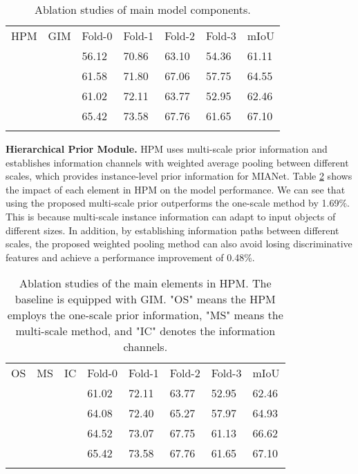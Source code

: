 \documentclass[10pt,twocolumn,letterpaper]{article}
\begin{document}
\begin{table}[]
	\centering
	\renewcommand\tabcolsep{2.2pt}
	\caption{Ablation studies of main model components.}
	\begin{tabular}{ll|llll|l}
		\Xhline{1.5pt}
		HPM & GIM & Fold-0 & Fold-1 & Fold-2 & Fold-3 & mIoU \\ \Xhline{1pt}
		     &     & 56.12 & 70.86 & 63.10 & 54.36 & 61.11 \\
		   \checkmark  &     & 61.58 & 71.80 & 67.06 &57.75 & 64.55 \\
		    & \checkmark    & 61.02 & 72.11 & 63.77 & 52.95 & 62.46 \\
		  \checkmark   &  \checkmark   & 65.42 & 73.58 & 67.76 & 61.65 & 67.10 \\ \Xhline{1.5pt}
	\end{tabular}
	\label{table3}
\end{table}



\noindent\textbf{Hierarchical Prior Module.} HPM uses multi-scale prior information and establishes information channels with weighted average pooling between different scales, which provides instance-level prior information for MIANet. Table \ref{table4} shows the impact of each element in HPM on the model performance. We can see that using the proposed multi-scale prior outperforms the one-scale method by 1.69\%. This is because multi-scale instance information can adapt to input objects of different sizes. In addition, by establishing information paths between different scales, the proposed weighted pooling method can also avoid losing discriminative features and achieve a performance improvement of 0.48\%.\par


\begin{table}[]
	\centering
	\renewcommand\tabcolsep{2.2pt}
	\caption{Ablation studies of the main elements in HPM. The baseline is equipped with GIM. "OS" means the HPM employs the one-scale prior information, "MS" means the multi-scale method, and "IC" denotes the information channels.}
	\begin{tabular}{lll|llll|l}
		\Xhline{1.5pt}
		OS &MS & IC & Fold-0 & Fold-1 & Fold-2 & Fold-3 & mIoU \\ \Xhline{1pt}
		   &  &     & 61.02 & 72.11 & 63.77 & 52.95 & 62.46 \\
		   \checkmark&  &     & 64.08 & 72.40 & 65.27 & 57.97 & 64.93 \\
		   &  \checkmark &     & 64.52 &73.07 & 67.75 & 61.13 & 66.62 \\
		  &\checkmark   &  \checkmark   & 65.42 & 73.58 & 67.76 & 61.65 & 67.10 \\ \Xhline{1.5pt}
	\end{tabular}
	\label{table4}
\end{table}
\end{document}
